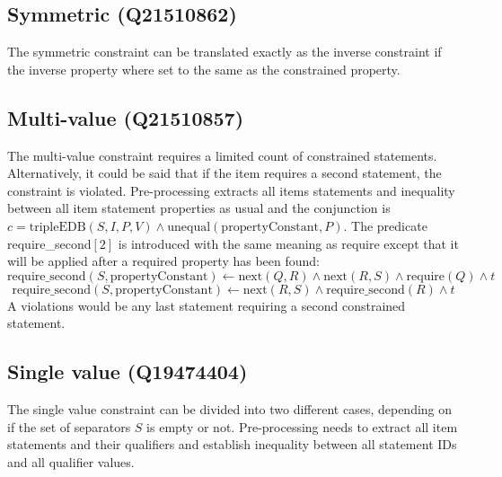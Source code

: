 \documentclass[hyperref,bachelorofscience,fleqn]{cgvpub}
\begin{document}
\subsection{Symmetric (Q21510862)}
The symmetric constraint can be translated exactly as the inverse constraint if the inverse property where set to the same as the constrained property.

\subsection{Multi-value (Q21510857)}
The multi-value constraint requires a limited count of constrained statements. Alternatively, it could be said that if the item requires a second statement, the constraint is violated. Pre-processing extracts all items statements and inequality between all item statement properties as usual and the conjunction is \(c = \text{tripleEDB}(S, I, P, V) \wedge \text{unequal}(\text{propertyConstant}, P)\). The predicate require\_second\([2]\) is introduced with the same meaning as require except that it will be applied after a required property has been found:
\begin{equation*}
\text{require\_second}(S, \text{propertyConstant}) \leftarrow \text{next}(Q, R) \wedge \text{next}(R, S) \wedge \text{require}(Q) \wedge t
\end{equation*}
\begin{equation*}
\text{require\_second}(S, \text{propertyConstant}) \leftarrow \text{next}(R, S) \wedge \text{require\_second}(R) \wedge t
\end{equation*}
A violations would be any last statement requiring a second constrained statement.

\subsection{Single value (Q19474404)}\label{subsec_3_single_value}
The single value constraint can be divided into two different cases, depending on if the set of separators \(S\) is empty or not. Pre-processing needs to extract all item statements and their qualifiers and establish inequality between all statement IDs and all qualifier values.
\end{document}
